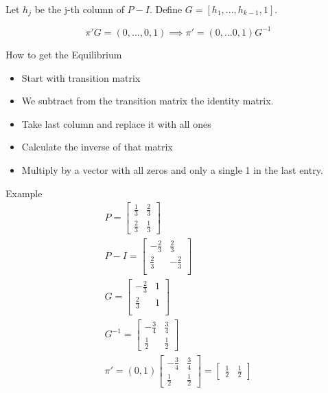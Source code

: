 \documentclass{report}
\begin{document}
\begin{description}
\begin{mdframed}
             Let $h_j$ be the j-th column of $P - I$. 
             Define $G = [h_1, ..., h_{k-1}, 1]$.

             \begin{displaymath}
                \pi'G = (0, ... ,0,1) \implies 
                \pi' = (0, ... 0,1)G^{-1}
             \end{displaymath}
        \end{mdframed}
        How to get the Equilibrium
        \begin{itemize}
            \item Start with transition matrix
            \item We subtract from the transition matrix
                the identity matrix.
            \item Take last column and replace it with all ones
            \item Calculate the inverse of that matrix
            \item Multiply by a vector with all zeros and only
                a single 1 in the last entry.
        \end{itemize}
        Example
        \begin{gather}
           P = 
           \begin{bmatrix}
               \frac{1}{3} & \frac{2}{3}\\ 
               \frac{2}{3} & \frac{1}{3}
           \end{bmatrix}\\
           P - I = 
           \begin{bmatrix}
               -\frac{2}{3} & \frac{2}{3}\\ 
               \frac{2}{3} & -\frac{2}{3}\\ 
           \end{bmatrix}\\
            G = 
            \begin{bmatrix}
               -\frac{2}{3} & 1\\ 
               \frac{2}{3} & 1\\ 
            \end{bmatrix}\\
            G^{-1} =
            \begin{bmatrix}
                -\frac{3}{4} & \frac{3}{4}\\ 
                \frac{1}{2} & \frac{1}{2}
            \end{bmatrix}\\
            \pi' = (0, 1)
            \begin{bmatrix}
                -\frac{3}{4} & \frac{3}{4}\\ 
                \frac{1}{2} & \frac{1}{2}
            \end{bmatrix}
            = 
            \begin{bmatrix}
                \frac{1}{2} & \frac{1}{2}
            \end{bmatrix}
        \end{gather}


\end{description}
\end{document}
